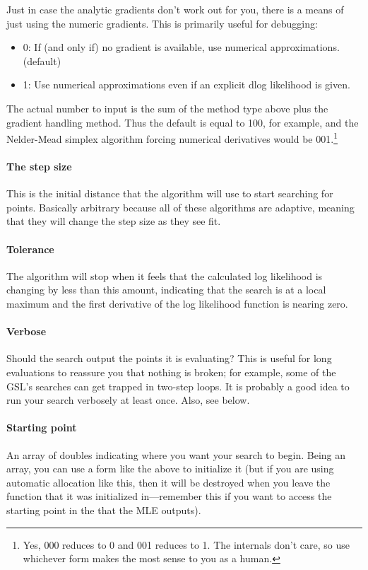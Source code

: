Just in case the analytic gradients don't work out for you, there is a
means of just using the numeric gradients. This is primarily useful for debugging:

\begin{itemize}
\item 0: If (and only if) no gradient is available, use numerical approximations.  (default)
\item 1: Use numerical approximations even if an explicit dlog likelihood is given. 
\end{itemize}

The actual number to input is the sum of the method type above plus the
gradient handling method. Thus the default is equal to 100, for example, and the
Nelder-Mead simplex algorithm forcing numerical derivatives would be
001.\footnote{Yes, 000 reduces to 0 and 001 reduces to 1. The internals
don't care, so use whichever form makes the most sense to you as a human.}


\paragraph{The step size} This is the initial distance that the
algorithm will use to start searching for points. Basically arbitrary
because all of these algorithms are adaptive, meaning that they will
change the step size as they see fit.

\paragraph{Tolerance} The algorithm will stop when it feels
that the calculated log likelihood is changing by less than this amount,
indicating that the search is at a local maximum and the first derivative of
the log likelihood function is nearing zero.

\paragraph{Verbose} Should the search output the points it is evaluating?
This is useful for long evaluations to reassure you that nothing is
broken; for example, some of the GSL's searches can get trapped in two-step loops.
It is probably a good idea to run your search verbosely at least once.
Also, see  below.

\paragraph{Starting point} An array of doubles indicating where you want
your search to begin. Being an array, you can use a form like the above
to initialize it (but if you are using automatic allocation like this, then it will be destroyed when you leave the
function that it was initialized in---remember this if you want to
access the starting point in the  that the MLE outputs).


